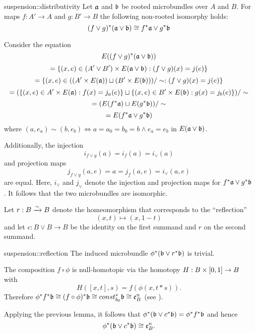 \begin{mylemma}{suspension::distributivity}
    Let $\mathfrak{a}$ and $\mathfrak{b}$ be rooted microbundles over $A$ and $B$.
    For maps $f: A' \to A$ and $g: B' \to B$ the following non-rooted isomorphy holds:
    \[ (f \vee g)^*(\mathfrak{a} \vee \mathfrak{b}) \cong f^*\mathfrak{a} \vee g^*\mathfrak{b} \]
\end{mylemma}

\begin{myproof}
    Consider the equation
    \[ E((f \vee g)^*(\mathfrak{a} \vee \mathfrak{b})) \]
    \[ = \{(x, e) \in (A' \vee B') \times E(\mathfrak{a} \vee \mathfrak{b}):(f \vee g)(x) = j(e)\} \]
    \[ = \{(x, e) \in ((A' \times E(\mathfrak{a})) \sqcup (B' \times E(\mathfrak{b}))) / \sim:(f \vee g)(x) = j(e)\} \]
    \[ = (\{(x, e) \in A' \times E(\mathfrak{a}):f(x) = j_a(e)\} \sqcup \{(x, e) \in B' \times E(\mathfrak{b}):g(x) = j_b(e)\}) / \sim \]
    \[ = (E(f^*\mathfrak{a}) \sqcup E(g^*\mathfrak{b})) / \sim \]
    \[ = E(f^*\mathfrak{a} \vee g^*\mathfrak{b}) \]
    where $(a, e_a) \sim (b, e_b) \iff a = a_0 = b_0 = b \land e_a = e_b$ in $E(\mathfrak{a} \vee \mathfrak{b})$.

    Additionally, the injection
    \[ i_{f \vee g}(a) = i_f(a) = i_{\vee}(a) \]
    and projection maps
    \[ j_{f \vee g}(a, e) = a = j_f(a, e) = i_{\vee}(a, e) \]
    are equal.
    Here, $i_\vee$ and $j_\vee$ denote the
    injection and projection maps for $f^*\mathfrak{a} \vee g^*\mathfrak{b}$.
    It follows that the two microbundles are isomorphic.
\end{myproof}

\begin{myparagraph}
    Let $r: B \xrightarrow{\sim} B$ denote the homeomorphism that corresponds to the ``reflection''
    \[ (x, t) \mapsto (x, 1 - t)\]
    and let $c: B \vee B \to B$ be the identity on the first summand and $r$ on the second summand.
\end{myparagraph}

\begin{mylemma}{suspension::reflection}
    The induced microbundle $\phi^*(\mathfrak{b} \vee r^*\mathfrak{b})$ is trivial.
\end{mylemma}
\begin{myproof}
    The composition $f \circ \phi$ is null-homotopic via the homotopy $H: B \times [0, 1] \to B$ with
    \[ H([x, t], s) = f(\phi(x, t * s)). \]
    Therefore $\phi^*f^*\mathfrak{b} \cong (f \circ \phi)^*\mathfrak{b}\cong const_{b_0}^*\mathfrak{b} \cong \mathfrak{e}^{n}_B$ (see ).
    
    Applying the previous lemma, it follows that $\phi^*(\mathfrak{b} \vee c^*\mathfrak{b}) = \phi^*f^*\mathfrak{b}$ and hence
    \[ \phi^*(\mathfrak{b} \vee c^*\mathfrak{b}) \cong \mathfrak{e}^{n}_B. \]
\end{myproof}